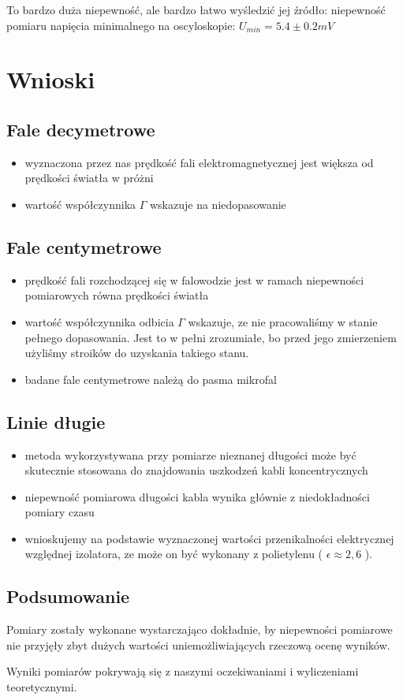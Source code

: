 \documentclass[a4paper,11pt]{article}
\begin{document}
To bardzo duża niepewność, ale bardzo łatwo wyśledzić jej źródło:
niepewność pomiaru napięcia minimalnego na oscyloskopie:
\( U _{min}  = 5.4 \pm 0.2 mV \)\\


\section{Wnioski}

\subsection{Fale decymetrowe}
\begin{itemize}
  \item wyznaczona przez nas prędkość fali elektromagnetycznej jest większa od prędkości światła w próżni
  \item  wartość współczynnika \( \Gamma \) wskazuje na niedopasowanie
\end{itemize}
\subsection{Fale centymetrowe}

\begin{itemize}
  \item prędkość fali rozchodzącej się w falowodzie jest w ramach niepewności pomiarowych równa prędkości światła
  
  \item wartość współczynnika odbicia \( \Gamma \) wskazuje, ze nie pracowaliśmy w stanie pełnego dopasowania. Jest to w pełni zrozumiałe, bo przed jego zmierzeniem użyliśmy stroików do uzyskania takiego stanu.
  
  \item badane fale centymetrowe należą do pasma mikrofal
\end{itemize}

\subsection{Linie długie}

\begin{itemize}
  \item metoda wykorzystywana przy pomiarze nieznanej długości może być skutecznie stosowana do znajdowania uszkodzeń kabli koncentrycznych
  \item niepewność pomiarowa długości kabla wynika głównie z niedokładności pomiary czasu
  \item wnioskujemy na podstawie wyznaczonej wartości przenikalności elektrycznej względnej izolatora, ze może on być wykonany z polietylenu ( \(\epsilon \approx 2,6 \) ).
\end{itemize}

\subsection {Podsumowanie}
Pomiary zostały wykonane wystarczająco dokładnie, by niepewności pomiarowe nie przyjęły zbyt dużych wartości uniemożliwiających rzeczową ocenę wyników.

Wyniki pomiarów pokrywają się z naszymi oczekiwaniami i wyliczeniami teoretycznymi.
\end{document}
